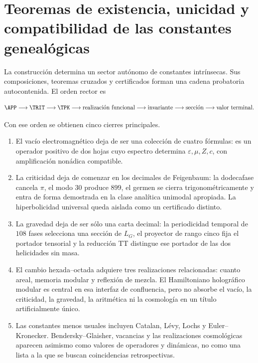 
\section{Teoremas de existencia, unicidad y compatibilidad de las constantes genealógicas}

La construcción determina un sector aut\'onomo de constantes intr\'insecas.
Sus composiciones, teoremas cruzados y certificados forman una cadena
probatoria autocontenida. El orden rector es

{\small
\begin{equation}
\APP\longrightarrow\TRIT\longrightarrow\TPK
\longrightarrow\text{realizaci\'on funcional}
\longrightarrow\text{invariante}
\longrightarrow\text{secci\'on}
\longrightarrow\text{valor terminal}.
\label{eq:final-causal-chain}
\end{equation}
}

Con ese orden se obtienen cinco cierres principales.

\begin{enumerate}
\item El vac\'io electromagn\'etico deja de ser una colecci\'on de cuatro
f\'ormulas: es un operador positivo de dos hojas cuyo espectro determina
\(\varepsilon,\mu,Z,c\), con amplificaci\'on non\'adica compatible.

\item La criticidad deja de comenzar en los decimales de Feigenbaum: la
dodecafase cancela \(\pi\), el modo \(30\) produce \(899\), el germen se cierra
trigonom\'etricamente y entra de forma demostrada en la clase anal\'itica
unimodal apropiada. La hiperbolicidad universal queda aislada como un
certificado distinto.

\item La gravedad deja de ser s\'olo una carta decimal: la periodicidad temporal de \(108\) fases selecciona una
secci\'on de \(L_G\), el proyector de rango cinco fija el portador tensorial y
la reducci\'on TT distingue ese portador de las dos helicidades sin masa.

\item El cambio hexada--octada adquiere tres realizaciones relacionadas:
cuanto
areal, memoria modular y reflexi\'on de mezcla. El Hamiltoniano hologr\'afico
modular es central en esa interfaz de confluencia, pero no absorbe el vac\'io, la criticidad,
la gravedad, la aritm\'etica ni la cosmolog\'ia en un t\'itulo artificialmente
\'unico.

\item Las constantes menos usuales incluyen Catalan, L\'evy, Lochs y
Euler--Kronecker. Bendersky--Glaisher, vacancias y las realizaciones cosmol\'ogicas
aparecen asimismo como valores de operadores y din\'amicas, no como una lista
a la que se buscan coincidencias retrospectivas.
\end{enumerate}

